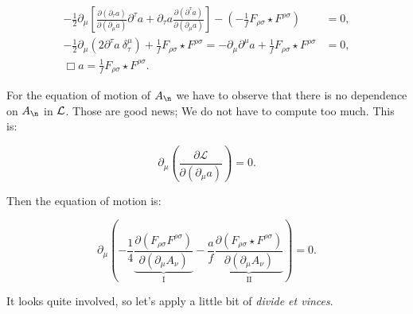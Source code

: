 \begin{equation}
	\begin{split}
		-\frac{1}{2} \partial_{\mu}\left[\frac{\partial\left(\partial_{\tau} a\right)}{\partial\left(\partial_{\mu} a\right)} \partial^{\tau} a+\partial_{\tau} a \frac{\partial\left(\partial^{\tau} a\right)}{\partial\left(\partial_{\mu} a\right)}\right]-\left(-\frac{1}{f} F_{\rho \sigma} \star F^{\rho \sigma}\right)&=0, \\
		-\frac{1}{2} \partial_{\mu}\left(2 \partial^{\tau} a \: \delta_{\tau}^{\mu}\right)+\frac{1}{f} F_{\rho \sigma} \star F^{\rho \sigma}=-\partial_{\mu} \partial^{\mu} a+\frac{1}{f} F_{\rho \sigma} \star F ^{\rho \sigma}&=0, \\
	\Box a=\frac{1}{f} F_{\rho \sigma} \star F^{\rho \sigma}.&
	\end{split}
\end{equation}

For the equation of motion of $\vad{\n}$ we have to observe that there is no dependence on $\vad{\n}$ in $\mathcal{L}$. Those are good news; We do not have to compute too much. This is:

\begin{equation}
		\partial_{\mu}\left(\frac{\partial \mathcal{L}}{\partial\left(\partial_{\mu} a\right)}\right)=0.
\end{equation}

Then the equation of motion is:

\begin{equation}
	\partial_{\mu}\left(-\frac{1}{4} \underbrace{\frac{\partial\left(F_{\rho \sigma} F^{\rho \sigma}\right)}{\partial\left(\partial_{\mu} A_{\nu}\right)}}_{\text{I}}-\frac{a}{f} \underbrace{\frac{\partial\left(F_{\rho \sigma} \star F^{\rho \sigma}\right)}{\partial\left(\partial_{\mu} A_{\nu}\right)}}_{\text{II}}\right)=0.
\end{equation}

It looks quite involved, so let's apply a little bit of \textit{divide et vinces}.

